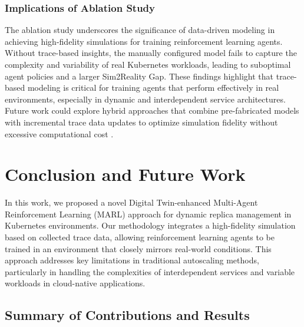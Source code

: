 \documentclass[conference]{IEEEtran}
\begin{document}
\subsubsection{Implications of Ablation Study}

The ablation study underscores the significance of data-driven modeling in achieving high-fidelity simulations for training reinforcement learning agents. Without trace-based insights, the manually configured model fails to capture the complexity and variability of real Kubernetes workloads, leading to suboptimal agent policies and a larger Sim2Reality Gap. These findings highlight that trace-based modeling is critical for training agents that perform effectively in real environments, especially in dynamic and interdependent service architectures. Future work could explore hybrid approaches that combine pre-fabricated models with incremental trace data updates to optimize simulation fidelity without excessive computational cost \cite{wu_multi_objective_rl}.

\section{Conclusion and Future Work}
\label{sec:conclusion}

In this work, we proposed a novel Digital Twin-enhanced Multi-Agent Reinforcement Learning (MARL) approach for dynamic replica management in Kubernetes environments. Our methodology integrates a high-fidelity simulation based on collected trace data, allowing reinforcement learning agents to be trained in an environment that closely mirrors real-world conditions. This approach addresses key limitations in traditional autoscaling methods, particularly in handling the complexities of interdependent services and variable workloads in cloud-native applications.

\subsection{Summary of Contributions and Results}
\end{document}
